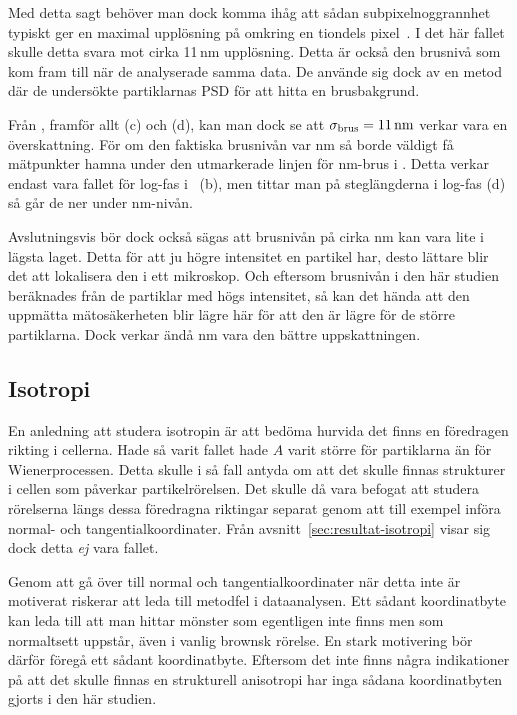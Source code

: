 Med detta sagt behöver man dock komma ihåg att sådan subpixelnoggrannhet typiskt ger en maximal upplösning på omkring en tiondels pixel~\cite{Saunter2010}. I det här fallet skulle detta svara mot cirka 11\,nm upplösning. Detta är också den brusnivå som \cite{Midtveldt_etal2016} kom fram till när de analyserade samma data. De använde sig dock av en metod där de undersökte partiklarnas PSD för att hitta en brusbakgrund. 


Från , framför allt (c) och (d), kan man dock se att $\sigma_\text{brus}=\unit[11]{nm}$ verkar vara en överskattning. För om den faktiska brusnivån var \unit[11]{nm} så borde väldigt få mätpunkter hamna under den utmarkerade linjen för \unit[11]{nm}-brus i . Detta verkar endast vara fallet för log-fas i ~(b), men tittar man på steglängderna i log-fas (d) så går de ner under \unit[11]{nm}-nivån.

Avslutningsvis bör dock också sägas att brusnivån på cirka \unit[5]{nm} kan vara lite i lägsta laget. Detta för att ju högre intensitet en partikel har, desto lättare blir det att lokalisera den i ett mikroskop. Och eftersom brusnivån i den här studien beräknades från de partiklar med högs intensitet, så kan det hända att den uppmätta mätosäkerheten blir lägre här för att den är lägre för de större partiklarna. Dock verkar ändå \unit[5]{nm} vara den bättre uppskattningen.





\subsection{Isotropi}

En anledning att studera isotropin är att bedöma hurvida det finns en föredragen rikting i cellerna. Hade så varit fallet hade $A$ varit större för partiklarna än för Wienerprocessen. Detta skulle i så fall antyda om att det skulle finnas strukturer i cellen som påverkar partikelrörelsen. Det skulle då vara befogat att studera rörelserna längs dessa föredragna riktingar separat genom att till exempel införa normal- och tangentialkoordinater. Från avsnitt~\ref{sec:resultat-isotropi} visar sig dock detta \emph{ej} vara fallet.

Genom att gå över till normal och tangentialkoordinater när detta inte är motiverat riskerar att leda till metodfel i dataanalysen. Ett sådant koordinatbyte kan leda till att man hittar mönster som egentligen inte finns men som normaltsett uppstår, även i vanlig brownsk rörelse. En stark motivering bör därför föregå ett sådant koordinatbyte. Eftersom det inte finns några indikationer på att det skulle finnas en strukturell anisotropi har inga sådana koordinatbyten gjorts i den här studien.


